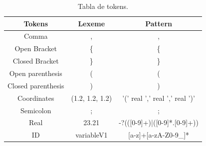 \documentclass[12pt]{article}
\begin{document}
\begin{table}[h]
\centering
\begin{tabular}{| c | c | c |} \hline
\textbf{Tokens}   			& \textbf{Lexeme} 										&  \textbf{Pattern} 					\\\hline
Comma             			& ,       												& ,        								\\\hline
Open Bracket      			& \{       												& \{        							\\\hline
Closed Bracket    			& \}       												& \}       								\\\hline
Open parenthesis  			& (       												& (        								\\\hline
Closed parenthesis			& )       												& )        								\\\hline
Coordinates       			& (1.2, 1.2, 1.2)       								& '(' real ',' real ',' real ')'       	\\\hline
Semicolon       			& ;       												& ;		 								\\\hline
Real              			& 23.21       											& -?(([0-9]+)|([0-9]*.[0-9]+))  		\\\hline
ID             				& variableV1       										& [a-z]+[a-zA-Z0-9\_]* 					\\\hline

\end{tabular}
\caption{\label{tab:Tokens}Tabla de tokens.}
\end{table}
\end{document}
